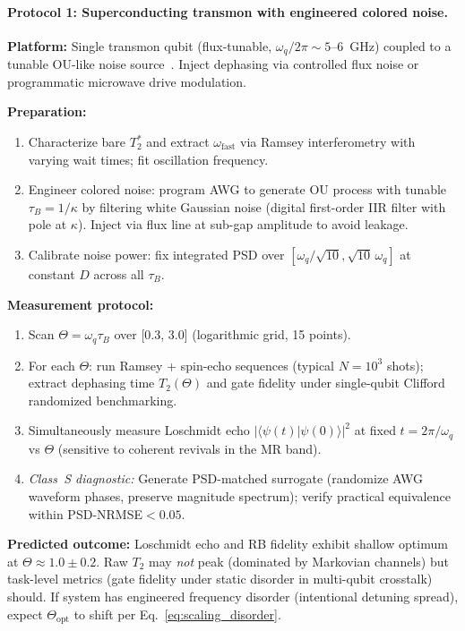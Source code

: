 \documentclass[11pt,letterpaper]{article}
\begin{document}
\paragraph{Protocol 1: Superconducting transmon with engineered colored
noise.}
\textbf{Platform:} Single transmon qubit (flux-tunable,
$\omega_q/2\pi\sim 5$--6~GHz) coupled to a tunable OU-like noise
source~\cite{blais2020_cqed}. Inject dephasing via controlled flux noise
or programmatic microwave drive modulation.

\textbf{Preparation:}
\begin{enumerate}[nosep,leftmargin=*]
\item Characterize bare $T_2^*$ and extract $\omega_{\mathrm{fast}}$ via
Ramsey interferometry with varying wait times; fit oscillation frequency.
\item Engineer colored noise: program AWG to generate OU process with
tunable $\tau_B = 1/\kappa$ by filtering white Gaussian noise (digital
first-order IIR filter with pole at $\kappa$). Inject via flux line at
sub-gap amplitude to avoid leakage.
\item Calibrate noise power: fix integrated PSD over
$[\omega_q/\sqrt{10}, \sqrt{10}\,\omega_q]$ at constant $D$ across all
$\tau_B$.
\end{enumerate}

\textbf{Measurement protocol:}
\begin{enumerate}[nosep,leftmargin=*]
\item Scan $\Theta = \omega_q\tau_B$ over [0.3, 3.0] (logarithmic grid,
15 points).
\item For each $\Theta$: run Ramsey + spin-echo sequences (typical
$N=10^3$ shots); extract dephasing time $T_2(\Theta)$ and gate fidelity
under single-qubit Clifford randomized benchmarking.
\item Simultaneously measure Loschmidt echo $|\langle\psi(t)|\psi(0)\rangle|^2$
at fixed $t=2\pi/\omega_q$ vs $\Theta$ (sensitive to coherent revivals in
the MR band).
\item \emph{Class~S diagnostic:} Generate PSD-matched surrogate (randomize
AWG waveform phases, preserve magnitude spectrum); verify practical
equivalence within PSD-NRMSE$<0.05$.
\end{enumerate}

\textbf{Predicted outcome:} Loschmidt echo and RB fidelity exhibit shallow
optimum at $\Theta\approx 1.0\pm 0.2$. Raw $T_2$ may \emph{not} peak
(dominated by Markovian channels) but task-level metrics (gate fidelity
under static disorder in multi-qubit crosstalk) should. If system has
engineered frequency disorder (intentional detuning spread), expect
$\Theta_{\text{opt}}$ to shift per Eq.~\eqref{eq:scaling_disorder}.
\end{document}
